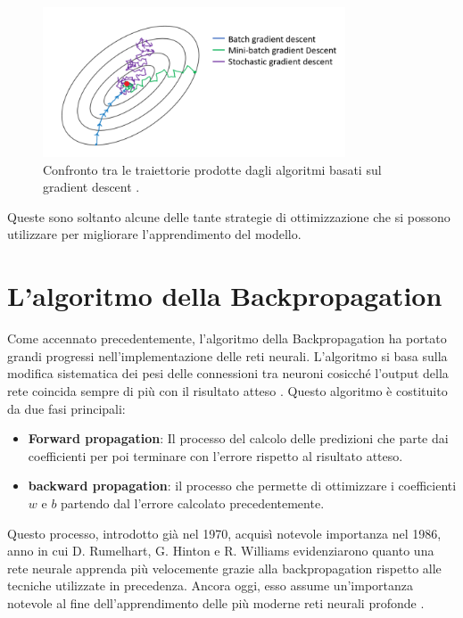  \begin{figure}[H]
    \centering
    \includegraphics[width=0.8\textwidth]{Immagini/Grafici/paragonebatch.png}
    \caption{Confronto tra le traiettorie prodotte dagli algoritmi basati sul gradient descent \cite{Full Batch vs Stochastic vs Mini Batch}.}
    \label{fig:paragonebatch}
\end{figure}

Queste sono soltanto alcune delle tante strategie di ottimizzazione 
che si possono utilizzare per migliorare l'apprendimento del modello.


\section{L'algoritmo della Backpropagation}
Come accennato precedentemente, l'algoritmo della Backpropagation ha portato 
grandi progressi nell'implementazione delle reti neurali.
L’algoritmo si basa sulla modifica sistematica dei 
pesi delle connessioni tra neuroni cosicché l’output della rete coincida 
sempre di più con il risultato atteso 
\cite{GradientDescent_NeuralNetworks,ALL_DEEP_LEARNING,ASPETTI_MLP_1,ASPETTI_MLP_2,Introduzione_backpropagation}.
Questo algoritmo è costituito da due fasi principali:

\begin{itemize}
    \item \textbf{Forward propagation}: Il processo del calcolo delle predizioni che parte dai 
    coefficienti per poi terminare con l’errore rispetto al risultato atteso.
    \item \textbf{backward propagation}: il processo che permette di ottimizzare i 
    coefficienti $w$ e $b$ partendo dal l’errore calcolato precedentemente.
\end{itemize}

Questo processo, introdotto già nel 1970, acquisì notevole importanza
nel 1986, anno in cui D. Rumelhart, G. Hinton e R. Williams evidenziarono quanto una 
rete neurale apprenda più velocemente grazie alla backpropagation rispetto alle
tecniche utilizzate in precedenza. Ancora oggi, esso assume un’importanza notevole al fine 
dell’apprendimento delle più moderne reti neurali profonde \cite{Articolo_backpropagation}.


